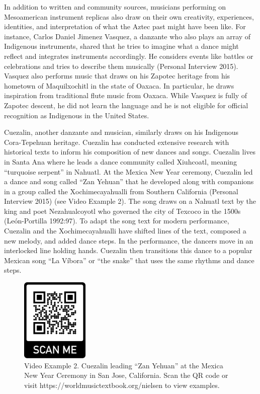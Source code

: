 \documentclass[twoside]{article}
\providecommand{\wmturl}{https://worldmusictextbook.org/nielsen}
\providecommand{\wmturlcaption}{
  Scan the QR code or visit \wmturl{} to view examples.
}
\begin{document}
In addition to written and community sources, musicians performing on
Mesoamerican instrument replicas also draw on their own creativity,
experiences, identities, and interpretation of what the Aztec past might
have been like. For instance, Carlos Daniel Jimenez Vasquez, a danzante
who also plays an array of Indigenous instruments, shared that he tries
to imagine what a dance might reflect and integrates instruments
accordingly. He considers events like battles or celebrations and tries
to describe them musically (Personal Interview 2015). Vasquez also
performs music that draws on his Zapotec heritage from his hometown of
Maquilxochitl in the state of Oaxaca. In particular, he draws
inspiration from traditional flute music from Oaxaca. While Vasquez is
fully of Zapotec descent, he did not learn the language and he is not
eligible for official recognition as Indigenous in the United States.

Cuezalin, another danzante and musician, similarly draws on his
Indigenous Cora-Tepehuan heritage. Cuezalin has conducted extensive
research with historical texts to inform his composition of new dances
and songs. Cuezalin lives in Santa Ana where he leads a dance community
called Xiuhcoatl, meaning ``turquoise serpent'' in Nahuatl. At the
Mexica New Year ceremony, Cuezalin led a dance and song called ``Zan
Yehuan'' that he developed along with companions in a group called the
Xochimecayahualli from Southern California (Personal Interview 2015)
(see Video Example 2). The song draws on a Nahuatl text by the king and
poet Nezahualcoyotl who governed the city of Texcoco in the 1500s
(León-Portilla 1992:97). To adapt the song text for modern performance,
Cuezalin and the Xochimecayahualli have shifted lines of the text,
composed a new melody, and added dance steps. In the performance, the
dancers move in an interlocked line holding hands. Cuezalin then
transitions this dance to a popular Mexican song ``La Víbora'' or ``the
snake'' that uses the same rhythms and dance steps.

\begin{figure}
  \centering
  \includegraphics[height=4cm]{qr-rick.png}
  \caption*{Video Example 2. Cuezalin leading ``Zan Yehuan'' at the Mexica New
  Year Ceremony in San Jose, California. \wmturlcaption}
\end{figure}
\end{document}
